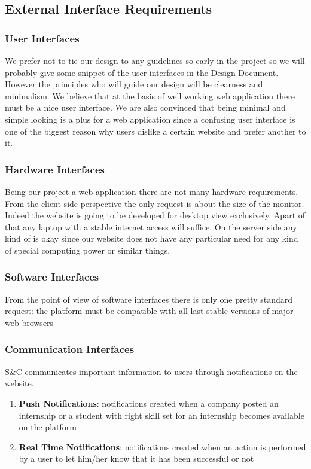 

\subsection{External Interface Requirements}
    \subsubsection{User Interfaces}
    We prefer not to tie our design to any guidelines so early in the project so we will probably give some snippet of the user interfaces in the Design Document. However the principles who will guide our design will be clearness and minimalism. We believe that at the basis of well working web application there must be a nice user interface. We are also convinced that being minimal and simple looking is a plus for a web application since a confusing user interface is one of the biggest reason why users dislike a certain website and prefer another to it.

    \subsubsection{Hardware Interfaces}
    Being our project a web application there are not many hardware requirements. From the client side perspective the only request is about the size of the monitor. Indeed the website is going to be developed for desktop view exclusively. Apart of that any laptop with a stable internet access will suffice. On the server side any kind of is okay since our website does not have any particular need for any kind of special computing power or similar things.

    \subsubsection{Software Interfaces}
    From the point of view of software interfaces there is only one pretty standard request: the platform must be compatible with all last stable versions of major web browsers
    
    \subsubsection{Communication Interfaces}
    S\&C communicates important information to users through notifications on the website.
    
    \begin{enumerate}
        \item  \textbf{Push Notifications}: notifications created when a company posted an internship or a student with right skill set for an internship becomes available on the platform
        \item \textbf{Real Time Notifications}: notifications created when an action is performed by a user to let him/her know that it has been successful or not
    \end{enumerate}
